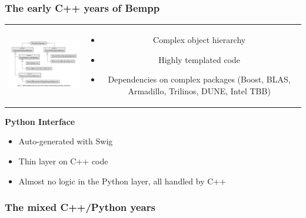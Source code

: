 \documentclass[dvipsnames,10pt]{beamer}
\begin{document}
\begin{frame}
	\frametitle{The early C++ years of Bempp}
	
	\begin{tabular}{cc}
		\begin{minipage}{6cm}
			\begin{center}
			\includegraphics[width=6cm]{../figs/bempp_cpp_objects}
			\end{center}
		\end{minipage} &
		\begin{minipage}{5cm}
			\small
			\begin{itemize}
			\item Complex object hierarchy
			\item Highly templated code
			\item Dependencies on complex packages (Boost, BLAS, Armadillo, Trilinos, DUNE, Intel TBB)
			\end{itemize}
		\end{minipage}
	\end{tabular}
	
	\vspace{\baselineskip}
	
	\textbf{Python Interface}
	
	\begin{itemize}
		\item Auto-generated with Swig
		\item Thin layer on C++ code
		\item Almost no logic in the Python layer, all handled by C++
	\end{itemize}
\end{frame}
		
\begin{frame}
	\frametitle{The mixed C++/Python years}
	
\end{frame}
\end{document}
